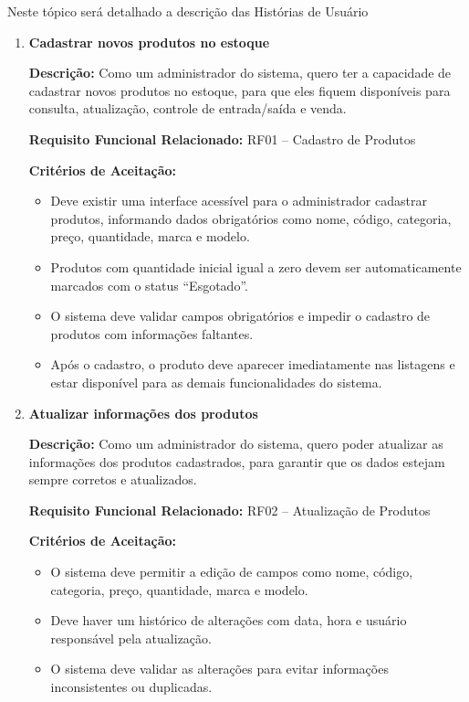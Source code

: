 \documentclass[
	12pt,				%
	openany,			%
	twoside,			%
	a4paper,			%
	english,			%
	brazil				%
	]{abntex2}
\begin{document}
Neste tópico será detalhado a descrição das Histórias de Usuário

\begin{enumerate}

\item \textbf{Cadastrar novos produtos no estoque}

\textbf{Descri\c{c}\~ao:} Como um administrador do sistema, quero ter a capacidade de cadastrar novos produtos no estoque, para que eles fiquem dispon\'iveis para consulta, atualiza\c{c}\~ao, controle de entrada/sa\'ida e venda.

\textbf{Requisito Funcional Relacionado:} RF01 -- Cadastro de Produtos

\textbf{Crit\'erios de Aceita\c{c}\~ao:}
\begin{itemize}
  \item Deve existir uma interface acess\'ivel para o administrador cadastrar produtos, informando dados obrigat\'orios como nome, c\'odigo, categoria, pre\c{c}o, quantidade, marca e modelo.
  \item Produtos com quantidade inicial igual a zero devem ser automaticamente marcados com o status ``Esgotado''.
  \item O sistema deve validar campos obrigat\'orios e impedir o cadastro de produtos com informa\c{c}\~oes faltantes.
  \item Ap\'os o cadastro, o produto deve aparecer imediatamente nas listagens e estar dispon\'ivel para as demais funcionalidades do sistema.
\end{itemize}

\item \textbf{Atualizar informações dos produtos}

\textbf{Descrição:} Como um administrador do sistema, quero poder atualizar as informações dos produtos cadastrados, para garantir que os dados estejam sempre corretos e atualizados.

\textbf{Requisito Funcional Relacionado:} RF02 -- Atualização de Produtos

\textbf{Critérios de Aceitação:}
\begin{itemize}
  \item O sistema deve permitir a edição de campos como nome, código, categoria, preço, quantidade, marca e modelo.
  \item Deve haver um histórico de alterações com data, hora e usuário responsável pela atualização.
  \item O sistema deve validar as alterações para evitar informações inconsistentes ou duplicadas.
\end{itemize}


\end{enumerate}
\end{document}
